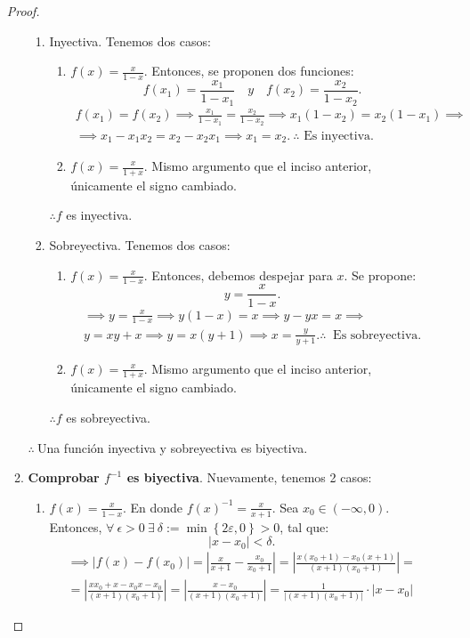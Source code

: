 \begin{enumerate}
\begin{proof}
\begin{enumerate}
\begin{enumerate}
				\item Inyectiva. Tenemos dos casos: 
				\begin{enumerate}
					\item $f(x)=\frac{x}{1-x}$. Entonces, se proponen dos funciones: $$f(x_1)=\frac{x_1}{1-x_1} \quad y \quad f(x_2)=\frac{x_2}{1-x_2}.$$
					\begin{align*}
						f(x_1)= f(x_2)\implies \frac{x_1}{1-x_1} = \frac{x_2}{1-x_2}\implies x_1(1-x_2)=x_2(1-x_1)\implies\\
						\implies x_1-x_1x_2=x_2-x_2x_1 \implies x_1=x_2. \ \therefore \text{ Es inyectiva.}
					\end{align*}
					\item $f(x)=\frac{x}{1+x}$. Mismo argumento que el inciso anterior, únicamente el signo cambiado. 
				\end{enumerate}
				$\therefore f$ es inyectiva.
				\item Sobreyectiva. Tenemos dos casos: 
				\begin{enumerate}
					\item $f(x)=\frac{x}{1-x}$. Entonces, debemos despejar para $x$. Se propone: $$y=\frac{x}{1-x}.$$
					\begin{align*}
						\implies y=\frac{x}{1-x} \implies y(1-x)= x\implies y -yx = x \implies\\ y = xy+x \implies y= x(y+1)\implies x= \frac{y}{y+1}. \therefore \ \text{ Es sobreyectiva.}
					\end{align*}
					\item $f(x)=\frac{x}{1+x}$. Mismo argumento que el inciso anterior, únicamente el signo cambiado. 
				\end{enumerate}
				$\therefore f$ es sobreyectiva.
			\end{enumerate}
			$\therefore  \ $Una función inyectiva y sobreyectiva es biyectiva. 
			\item  \textbf{Comprobar $f^{-1}$ es biyectiva}. Nuevamente, tenemos 2 casos: 
			\begin{enumerate}
				\item $f(x)= \frac{x}{1-x}$. En donde $f(x)^{-1}= \frac{x}{x+1}$. Sea $x_0\in (-\infty,0)$. Entonces, $\forall \ \epsilon >0 \ \exists \ \delta := \min\left\{2\varepsilon, 0\right\}>0$, tal que: 
				$$|x-x_0|<\delta.$$
				\begin{align*}
					\implies |f(x)-f(x_0)| = \left|\frac{x}{x+1}-\frac{x_0}{x_0+1}\right| = \left|\frac{x(x_0+1)-x_0(x+1)}{(x+1)(x_0+1)}\right|=\\
					= \left|\frac{xx_0+x-x_0x-x_0}{(x+1)(x_0+1)}\right|= \left|\frac{x-x_0}{(x+1)(x_0+1)}\right|= \frac{1}{|(x+1)(x_0+1)|}\cdot |x-x_0|

\end{align*}
\end{enumerate}
\end{enumerate}
\end{proof}
\end{enumerate}
